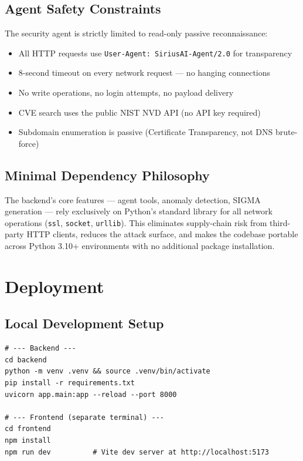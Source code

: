 \documentclass[12pt,a4paper]{article}
\begin{document}
\subsection{Agent Safety Constraints}

The security agent is strictly limited to read-only passive reconnaissance:

\begin{itemize}[noitemsep]
  \item All HTTP requests use \texttt{User-Agent: SiriusAI-Agent/2.0} for transparency
  \item 8-second timeout on every network request --- no hanging connections
  \item No write operations, no login attempts, no payload delivery
  \item CVE search uses the public NIST NVD API (no API key required)
  \item Subdomain enumeration is passive (Certificate Transparency, not DNS brute-force)
\end{itemize}

\subsection{Minimal Dependency Philosophy}

\begin{infobox}[title=Standard Library First]
The backend's core features --- agent tools, anomaly detection, SIGMA generation ---
rely exclusively on Python's standard library for all network operations
(\texttt{ssl}, \texttt{socket}, \texttt{urllib}). This eliminates supply-chain risk
from third-party HTTP clients, reduces the attack surface, and makes the codebase
portable across Python 3.10+ environments with no additional package installation.
\end{infobox}

\section{Deployment}

\subsection{Local Development Setup}

\begin{lstlisting}[style=pythonstyle, caption=Development environment bootstrap]
# --- Backend ---
cd backend
python -m venv .venv && source .venv/bin/activate
pip install -r requirements.txt
uvicorn app.main:app --reload --port 8000

# --- Frontend (separate terminal) ---
cd frontend
npm install
npm run dev          # Vite dev server at http://localhost:5173
\end{lstlisting}
\end{document}
